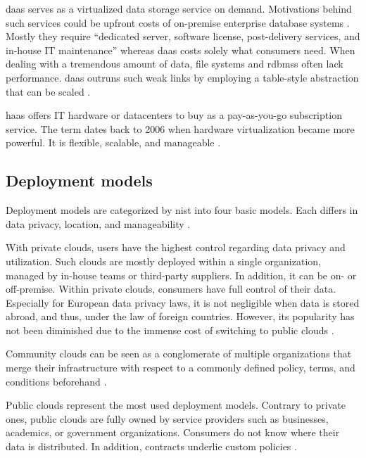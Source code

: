 \ac{daas} serves as a virtualized data storage service on demand.
Motivations behind such services could be upfront costs of on-premise enterprise database systems \cite{Dillon2010}.
Mostly they require \enquote{dedicated server, software license, post-delivery services, and in-house IT maintenance} \cite{Dillon2010} whereas \ac{daas} costs solely what consumers need.
When dealing with a tremendous amount of data, file systems and \acp{rdbms} often lack performance.
\ac{daas} outruns such weak links by employing a table-style abstraction that can be scaled \cite{Dillon2010}.

\ac{haas} offers IT hardware or datacenters to buy as a pay-as-you-go subscription service.
The term dates back to 2006 when hardware virtualization became more powerful.
It is flexible, scalable, and manageable \cite{Wang2010}.

\subsection{Deployment models}
\label{subsec:cloud-deployment}

Deployment models are categorized by \ac{nist} into four basic models.
Each differs in data privacy, location, and manageability \cite{Mell2011}.

With private clouds, users have the highest control regarding data privacy and utilization.
Such clouds are mostly deployed within a single organization, managed by in-house teams or third-party suppliers.
In addition, it can be on- or off-premise.
Within private clouds, consumers have full control of their data.
Especially for European data privacy laws, it is not negligible when data is stored abroad, and thus, under the law of foreign countries.
However, its popularity has not been diminished due to the immense cost of switching to public clouds \cite{Dillon2010, Mell2011}.

Community clouds can be seen as a conglomerate of multiple organizations that merge their infrastructure with respect to a commonly defined policy, terms, and conditions beforehand \cite{Mell2011}.

Public clouds represent the most used deployment models.
Contrary to private ones, public clouds are fully owned by service providers such as businesses, academics, or government organizations.
Consumers do not know where their data is distributed.
In addition, contracts underlie custom policies \cite{Mell2011}.

